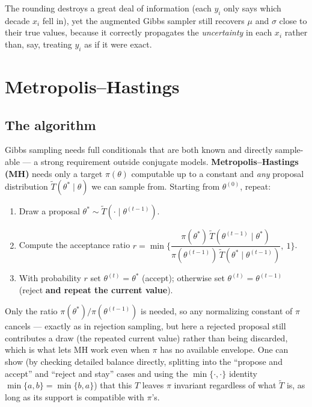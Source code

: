 \documentclass[
  letterpaper,
  DIV=11,
  numbers=noendperiod]{scrreprt}
\providecommand{\tightlist}{%
  \setlength{\itemsep}{0pt}\setlength{\parskip}{0pt}}
\begin{document}
The rounding destroys a great deal of information (each \(y_i\) only
says which decade \(x_i\) fell in), yet the augmented Gibbs sampler
still recovers \(\mu\) and \(\sigma\) close to their true values,
because it correctly propagates the \emph{uncertainty} in each \(x_i\)
rather than, say, treating \(y_i\) as if it were exact.

\section{Metropolis--Hastings}\label{metropolishastings}

\subsection{The algorithm}\label{the-algorithm-2}

Gibbs sampling needs full conditionals that are both known and directly
sample-able --- a strong requirement outside conjugate models.
\textbf{Metropolis--Hastings (MH)} needs only a target \(\pi(\theta)\)
computable up to a constant and \emph{any} proposal distribution
\(\tilde T(\theta^* \mid \theta)\) we can sample from. Starting from
\(\theta^{(0)}\), repeat:

\begin{enumerate}
\def\labelenumi{\arabic{enumi}.}
\tightlist
\item
  Draw a proposal \(\theta^* \sim \tilde T(\cdot \mid \theta^{(t-1)})\).
\item
  Compute the acceptance ratio
  \(r = \min\Big\{\dfrac{\pi(\theta^*)\,\tilde T(\theta^{(t-1)} \mid \theta^*)}{\pi(\theta^{(t-1)})\,\tilde T(\theta^* \mid \theta^{(t-1)})},\ 1\Big\}\).
\item
  With probability \(r\) set \(\theta^{(t)} = \theta^*\) (accept);
  otherwise set \(\theta^{(t)} = \theta^{(t-1)}\) (reject \textbf{and
  repeat the current value}).
\end{enumerate}

Only the ratio \(\pi(\theta^*)/\pi(\theta^{(t-1)})\) is needed, so any
normalizing constant of \(\pi\) cancels --- exactly as in rejection
sampling, but here a rejected proposal still contributes a draw (the
repeated current value) rather than being discarded, which is what lets
MH work even when \(\pi\) has no available envelope. One can show (by
checking detailed balance directly, splitting into the ``propose and
accept'' and ``reject and stay'' cases and using the
\(\min\{\cdot,\cdot\}\) identity \(\min\{a,b\} = \min\{b,a\}\)) that
this \(T\) leaves \(\pi\) invariant regardless of what \(\tilde T\) is,
as long as its support is compatible with \(\pi\)'s.
\end{document}
